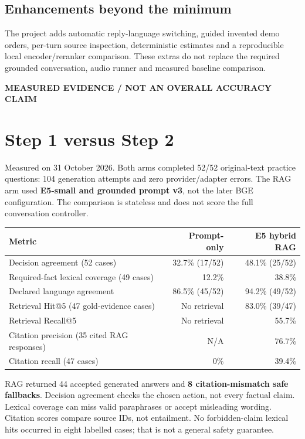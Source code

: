 \documentclass[10pt,a4paper]{article}
\newcommand{\tagline}[1]{{\small\bfseries\color{teal}#1}\par}
\begin{document}
\subsection{Enhancements beyond the minimum}
The project adds automatic reply-language switching, guided invented demo orders,
per-turn source inspection, deterministic estimates and a reproducible local
encoder/reranker comparison. These extras do not replace the required grounded
conversation, audio runner and measured baseline comparison.

\newpage
\tagline{MEASURED EVIDENCE / NOT AN OVERALL ACCURACY CLAIM}
\section{Step 1 versus Step 2}
Measured on 31 October 2026. Both arms completed 52/52 original-text practice
questions: 104 generation attempts and zero provider/adapter errors. The RAG arm
used \textbf{E5-small and grounded prompt v3}, not the later BGE configuration.
The comparison is stateless and does not score the full conversation controller.

{\small
\begin{tabularx}{\linewidth}{@{}Xrr@{}}
\toprule
\rowcolor{mint}\textbf{Metric} & \textbf{Prompt-only} & \textbf{E5 hybrid RAG}\\
\midrule
Decision agreement (52 cases) & 32.7\% (17/52) & 48.1\% (25/52)\\
Required-fact lexical coverage (49 cases) & 12.2\% & 38.8\%\\
Declared language agreement & 86.5\% (45/52) & 94.2\% (49/52)\\
Retrieval Hit@5 (47 gold-evidence cases) & No retrieval & 83.0\% (39/47)\\
Retrieval Recall@5 & No retrieval & 55.7\%\\
Citation precision (35 cited RAG responses) & N/A & 76.7\%\\
Citation recall (47 cases) & 0\% & 39.4\%\\
\bottomrule
\end{tabularx}}

RAG returned 44 accepted generated answers and \textbf{8 citation-mismatch safe
fallbacks}. Decision agreement checks the chosen action, not every factual claim.
Lexical coverage can miss valid paraphrases or accept misleading wording.
Citation scores compare source IDs, not entailment. No forbidden-claim lexical
hits occurred in eight labelled cases; that is not a general safety guarantee.
\end{document}
